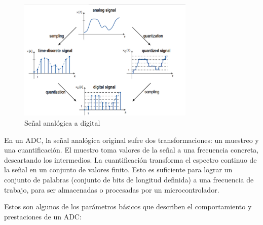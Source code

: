 \documentclass[12pt]{report} %
\begin{document}
	\begin{figure}[H]
		\includegraphics[width=0.75\textwidth]{analog-vs-digital-signal.jpg}
		\caption[Señal analógica a digital]{Señal analógica a digital\protect\footnotemark}
		\label{fig:analog-vs-digital-signal.jpg}
	\end{figure}

	En un ADC, la señal analógica original sufre dos transformaciones: un muestreo y una cuantificación. El muestro toma valores de la señal a una frecuencia concreta, descartando los intermedios. La cuantificación transforma el espectro continuo de la señal en un conjunto de valores finito. Esto es suficiente para lograr un conjunto de palabras (conjunto de bits de longitud definida) a una frecuencia de trabajo, para ser almacenadas o procesadas por un microcontrolador.
	
	Estos son algunos de los parámetros básicos que describen el comportamiento y prestaciones de un ADC:
	
\end{document}
